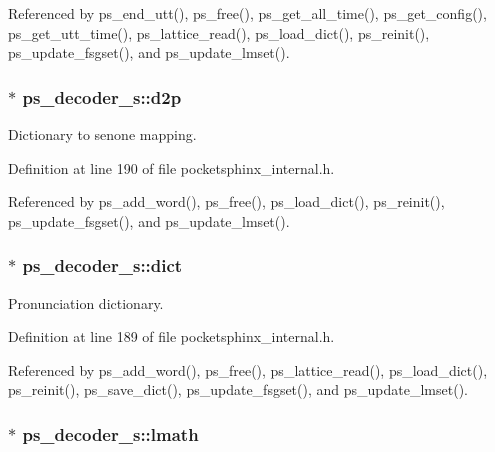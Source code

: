 \-Referenced by ps\-\_\-end\-\_\-utt(), ps\-\_\-free(), ps\-\_\-get\-\_\-all\-\_\-time(), ps\-\_\-get\-\_\-config(), ps\-\_\-get\-\_\-utt\-\_\-time(), ps\-\_\-lattice\-\_\-read(), ps\-\_\-load\-\_\-dict(), ps\-\_\-reinit(), ps\-\_\-update\-\_\-fsgset(), and ps\-\_\-update\-\_\-lmset().

\subsubsection[{d2p}]{$\ast$ {\bf ps\-\_\-decoder\-\_\-s\-::d2p}}\label{structps__decoder__s_ae6515cbc261686f3f3bbd95719f79793}


\-Dictionary to senone mapping. 



\-Definition at line 190 of file pocketsphinx\-\_\-internal.\-h.



\-Referenced by ps\-\_\-add\-\_\-word(), ps\-\_\-free(), ps\-\_\-load\-\_\-dict(), ps\-\_\-reinit(), ps\-\_\-update\-\_\-fsgset(), and ps\-\_\-update\-\_\-lmset().

\subsubsection[{dict}]{$\ast$ {\bf ps\-\_\-decoder\-\_\-s\-::dict}}\label{structps__decoder__s_aef6228c17907cc1d0cef835b238b5d91}


\-Pronunciation dictionary. 



\-Definition at line 189 of file pocketsphinx\-\_\-internal.\-h.



\-Referenced by ps\-\_\-add\-\_\-word(), ps\-\_\-free(), ps\-\_\-lattice\-\_\-read(), ps\-\_\-load\-\_\-dict(), ps\-\_\-reinit(), ps\-\_\-save\-\_\-dict(), ps\-\_\-update\-\_\-fsgset(), and ps\-\_\-update\-\_\-lmset().

\subsubsection[{lmath}]{$\ast$ {\bf ps\-\_\-decoder\-\_\-s\-::lmath}}\label{structps__decoder__s_abd17fe329f2fb219c5a534f3217c5b95}



